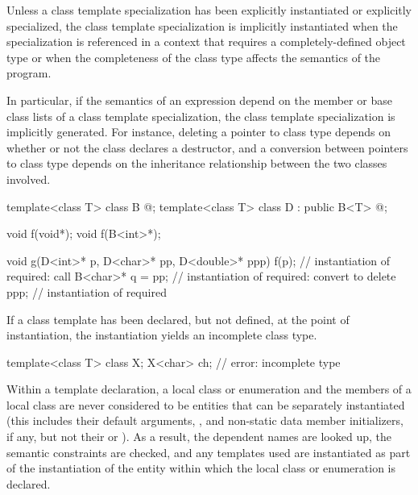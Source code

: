 \pnum
{}%
Unless a class template specialization has been explicitly
instantiated or explicitly
specialized,
the class template specialization is implicitly instantiated when the
specialization is referenced in a context that requires a completely-defined
object type or when the completeness of the class type affects the semantics
of the program.
\begin{note}
In particular, if the semantics of an expression depend on the member or
base class lists of a class template specialization, the class template
specialization is implicitly generated. For instance, deleting a pointer
to class type depends on whether or not the class declares a destructor,
and a conversion between pointers to class type depends on the
inheritance relationship between the two classes involved.
\end{note}
\begin{example}
\begin{codeblock}
template<class T> class B { @\commentellip@ };
template<class T> class D : public B<T> { @\commentellip@ };

void f(void*);
void f(B<int>*);

void g(D<int>* p, D<char>* pp, D<double>* ppp) {
  f(p);             // instantiation of  required: call 
  B<char>* q = pp;  // instantiation of  required: convert  to 
  delete ppp;       // instantiation of  required
}
\end{codeblock}
\end{example}
If a class template has been declared, but not defined,
at the point of instantiation,
the instantiation yields an incomplete class type.
\begin{example}
\begin{codeblock}
template<class T> class X;
X<char> ch;         // error: incomplete type 
\end{codeblock}
\end{example}
\begin{note}
Within a template declaration,
a local class or enumeration and the members of
a local class are never considered to be entities that can be separately
instantiated (this includes their default arguments,
, and non-static data member
initializers, if any,
but not their  or ).
As a result, the dependent names are looked up, the
semantic constraints are checked, and any templates used are instantiated as
part of the instantiation of the entity within which the local class or
enumeration is declared.
\end{note}

